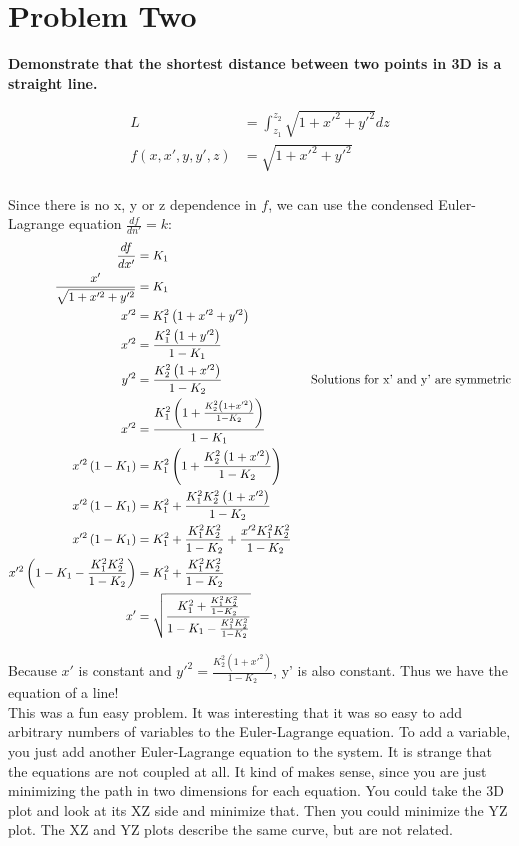 \documentclass[10pt]{article} %
\begin{document}
\section{Problem Two}
\textbf{Demonstrate that the shortest distance between two points in 3D is a straight line.}

\begin{align*}
  L &= \int_{z_1}^{z_2} \sqrt{1 + x'^2 + y'^2} dz\\
  f(x, x', y, y', z) &= \sqrt{1 + x'^2 + y'^2}\\
\end{align*}

Since there is no x, y or z dependence in $f$, we can use the condensed Euler-Lagrange equation $\frac{df}{dn'} = k$:\\

\begin{align*}
  \frac{df}{dx'} &= K_1\\
  \frac{x'}{\sqrt{1 + x'^2 + y'^2}} &= K_1\\
  x'^2 &= K_1^2\left(1 + x'^2 + y'^2\right)\\
  x'^2 &= \frac{K_1^2\left(1 + y'^2\right)}{1-K_1}\\
  y'^2 &= \frac{K_2^2\left(1 + x'^2\right)}{1-K_2}
  \hspace*{1in} \mbox{Solutions for x' and y' are symmetric}\\
  x'^2 &= \frac{K_1^2\left(1 + \frac{K_2^2\left(1 + x'^2\right)}{1-K_2}\right)}{1-K_1}\\
  x'^2\left(1-K_1\right) &= K_1^2\left(1 + \frac{K_2^2\left(1 + x'^2\right)}{1-K_2}\right)\\
  x'^2\left(1-K_1\right) &= K_1^2 + \frac{K_1^2K_2^2\left(1 + x'^2\right)}{1-K_2}\\
  x'^2\left(1-K_1\right) &= K_1^2 + \frac{K_1^2K_2^2}{1-K_2} + \frac{x'^2K_1^2K_2^2}{1-K_2}\\
  x'^2\left(1-K_1 - \frac{K_1^2K_2^2}{1-K_2}\right) &= K_1^2 + \frac{K_1^2K_2^2}{1-K_2}\\
  x' &= \sqrt{\frac{K_1^2 + \frac{K_1^2K_2^2}{1-K_2}}{1-K_1 - \frac{K_1^2K_2^2}{1-K_2}}}\\
\end{align*}

Because $x'$ is constant and $y'^2 = \frac{K_2^2\left(1 + x'^2\right)}{1-K_2}$, y' is also constant. Thus we have the equation of a line!\\

This was a fun easy problem. It was interesting that it was so easy to add arbitrary numbers of variables to the Euler-Lagrange equation. To add a variable, you just add another Euler-Lagrange equation to the system. It is strange that the equations are not coupled at all. It kind of makes sense, since you are just minimizing the path in two dimensions for each equation. You could take the 3D plot and look at its XZ side and minimize that. Then you could minimize the YZ plot. The XZ and YZ plots describe the same curve, but are not related.
\end{document}
